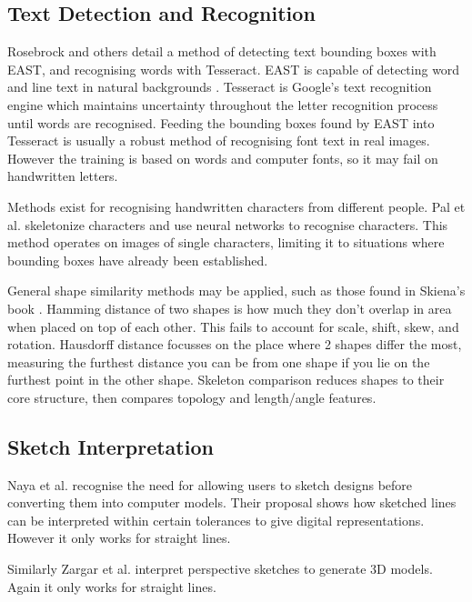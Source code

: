 \documentclass[conference]{IEEEtran}
\begin{document}
\subsection{Text Detection and Recognition}
Rosebrock \cite{rosebrock2018opencv} and others detail a method of detecting text bounding boxes with EAST, and recognising words with Tesseract. EAST is capable of detecting word and line text in natural backgrounds \cite{zhou2017east}. Tesseract \cite{smith2007overview} is Google's text recognition engine which maintains uncertainty throughout the letter recognition process until words are recognised. Feeding the bounding boxes found by EAST into Tesseract is usually a robust method of recognising font text in real images. However the training is based on words and computer fonts, so it may fail on handwritten letters.

Methods exist for recognising handwritten characters from different people. Pal et al. \cite{pal2010handwritten} skeletonize characters and use neural networks to recognise characters. This method operates on images of single characters, limiting it to situations where bounding boxes have already been established.

General shape similarity methods may be applied, such as those found in Skiena's book \cite{skiena2020algorithm}. Hamming distance of two shapes is how much they don't overlap in area when placed on top of each other. This fails to account for scale, shift, skew, and rotation. Hausdorff distance focusses on the place where 2 shapes differ the most, measuring the furthest distance you can be from one shape if you lie on the furthest point in the other shape. Skeleton comparison reduces shapes to their core structure, then compares topology and length/angle features.

\subsection{Sketch Interpretation}

Naya et al. \cite{naya2002direct} recognise the need for allowing users to sketch designs before converting them into computer models. Their proposal shows how sketched lines can be interpreted within certain tolerances to give digital representations. However it only works for straight lines.

Similarly Zargar et al. \cite{zargar2019introducing} interpret perspective sketches to generate 3D models. Again it only works for straight lines.
\end{document}

